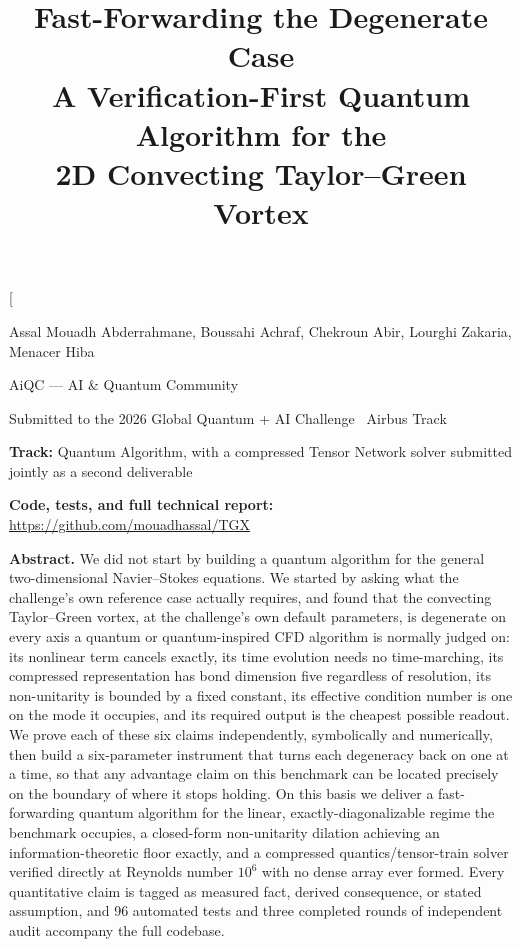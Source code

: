 \documentclass[10.5pt,twocolumn]{article}
\title{\vspace{-1.5em}\textbf{Fast-Forwarding the Degenerate Case}\\[0.3em]
\large A Verification-First Quantum Algorithm for the\\ 2D Convecting Taylor--Green Vortex}
\author{}
\date{}
\begin{document}
\makeatletter
\twocolumn[
\begin{@twocolumnfalse}
\maketitle
\thispagestyle{fancy}
\vspace{-3em}
\begin{center}
\large Assal Mouadh Abderrahmane, Boussahi Achraf, Chekroun Abir, Lourghi Zakaria, Menacer Hiba

\vspace{0.5em}
\normalsize AiQC --- AI \& Quantum Community

\vspace{0.5em}
\small Submitted to the 2026 Global Quantum + AI Challenge \textbar\ Airbus Track
\end{center}
\vspace{1em}
\begin{center}
\begin{minipage}{0.85\textwidth}
\small
\textbf{Track:} Quantum Algorithm, with a compressed Tensor Network solver submitted jointly as a second deliverable

\textbf{Code, tests, and full technical report:} \url{https://github.com/mouadhassal/TGX}~\cite{tgx2026}
\end{minipage}
\end{center}
\vspace{1.2em}
\begin{center}
\begin{minipage}{0.85\textwidth}
\textbf{Abstract.} We did not start by building a quantum algorithm for the general two-dimensional Navier--Stokes equations. We started by asking what the challenge's own reference case actually requires, and found that the convecting Taylor--Green vortex, at the challenge's own default parameters, is degenerate on every axis a quantum or quantum-inspired CFD algorithm is normally judged on: its nonlinear term cancels exactly, its time evolution needs no time-marching, its compressed representation has bond dimension five regardless of resolution, its non-unitarity is bounded by a fixed constant, its effective condition number is one on the mode it occupies, and its required output is the cheapest possible readout. We prove each of these six claims independently, symbolically and numerically, then build a six-parameter instrument that turns each degeneracy back on one at a time, so that any advantage claim on this benchmark can be located precisely on the boundary of where it stops holding. On this basis we deliver a fast-forwarding quantum algorithm for the linear, exactly-diagonalizable regime the benchmark occupies, a closed-form non-unitarity dilation achieving an information-theoretic floor exactly, and a compressed quantics/tensor-train solver verified directly at Reynolds number $10^6$ with no dense array ever formed. Every quantitative claim is tagged as measured fact, derived consequence, or stated assumption, and 96 automated tests and three completed rounds of independent audit accompany the full codebase.
\end{minipage}
\end{center}
\vspace{1em}
\end{@twocolumnfalse}
\end{document}
